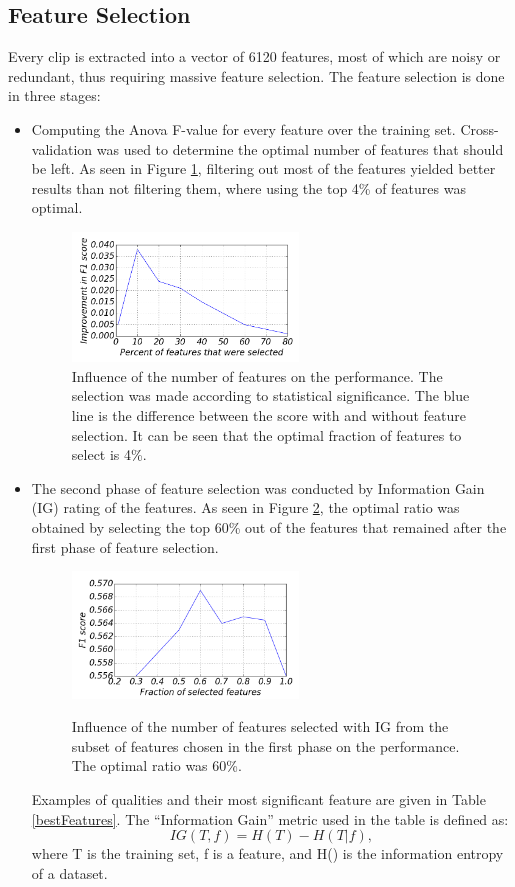 \documentclass[journal]{journal}
\begin{document}
\subsection{Feature Selection}
Every clip is extracted into a vector of 6120 features, most of which are noisy or redundant, thus requiring massive feature selection. The feature selection is done in three stages:
	\begin{itemize}
		\item
		Computing the Anova F-value for every feature over the training set. Cross-validation was used to determine the optimal number of features that should be
		left. As seen in Figure  \ref{selection}, filtering out most of the features yielded better          results than not filtering them, where using the top 4\% of features was optimal.
		\begin{figure}[ht!]
			\centering
			\includegraphics[width=60mm]{featureSelection.png}
			\caption{Influence of the number of features on the performance. The
			selection was made according to statistical significance.
			The blue line is the difference between the score with and without feature
			selection. It can be seen that the optimal fraction of features to select is
			4\%.}
			\label{selection}
			\end{figure}
		\item
			The second phase of feature selection was conducted by Information Gain (IG) rating of the features. As seen in Figure  \ref{igFromFclassif}, the optimal ratio was obtained by selecting the top 60\% out of the features that remained after the first
			phase of feature selection.
			 \begin{figure}[h]
				\centering
				\caption{Influence of the number of features selected with IG from the subset
				of features chosen in the first phase on the performance. The
				optimal ratio was 60\%.}
				\includegraphics[width=60mm]{igFromFclassif.png}
				\label{igFromFclassif}
			\end{figure}
			Examples of qualities and their most significant feature are given in 
			Table \ref{bestFeatures}. The ``Information Gain'' metric used
			in the table is defined as:
			\begin{equation*}
			       IG(T,f) = H(T) - H(T|f),
			\end{equation*}
			where T is the training set, f is a feature, and H() is the information
			entropy of a dataset.
			

\end{itemize}
\end{document}
